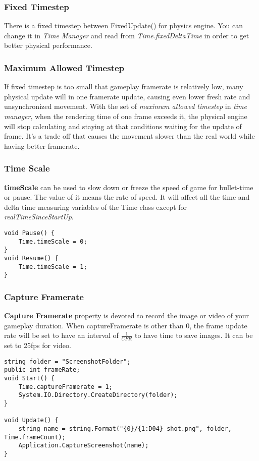 \documentclass[10pt, a4paper]{article}
\begin{document}
            \subsubsection{Fixed Timestep}
                There is a fixed timestep between FixedUpdate() for physics engine. You can change it in \emph{Time Manager} and read from \emph{Time.fixedDeltaTime} in order to get better physical performance.  
            \subsubsection{Maximum Allowed Timestep}
                If fixed timestep is too small that gameplay framerate is relatively low, many physical update will in one framerate update, causing even lower fresh rate and unsynchronized movement. With the set of \emph{maximum allowed timestep} in \emph{time manager}, when the rendering time of one frame exceeds it, the physical engine will stop calculating and staying at that conditions waiting for the update of frame. It's a trade off that causes the movement slower than the real world while having better framerate.  
            \subsubsection{Time Scale}
                \textbf{timeScale} can be used to slow down or freeze the speed of game for bullet-time or pause. The value of it means the rate of speed. It will affect all the time and delta time measuring variables of the Time class except for \emph{realTimeSinceStartUp}. 
\begin{lstlisting}
void Pause() {
    Time.timeScale = 0; 
}
void Resume() {
    Time.timeScale = 1; 
}
\end{lstlisting}

            \subsubsection{Capture Framerate}
                \textbf{Capture Framerate} property is devoted to record the image or video of your gameplay duration. When captureFramerate is other than 0, the frame update rate will be set to have an interval of $\frac{1}{CFR}$ to have time to save images. It can be set to 25fps for video. 
\begin{lstlisting}
string folder = "ScreenshotFolder"; 
public int frameRate; 
void Start() {
    Time.captureFramerate = 1; 
    System.IO.Directory.CreateDirectory(folder); 
}

void Update() {
    string name = string.Format("{0}/{1:D04} shot.png", folder, Time.frameCount); 
    Application.CaptureScreenshot(name); 
}
\end{lstlisting}
\end{document}
